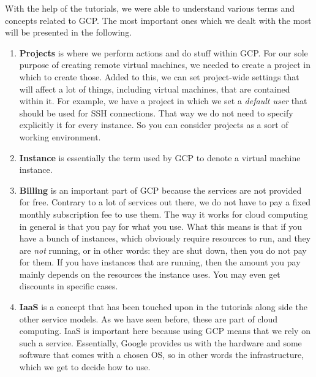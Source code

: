 With the help of the tutorials, we were able to understand various
terms and concepts related to GCP. The most important ones which we
dealt with the most will be presented in the following.

\begin{enumerate}

	\item \textbf{Projects} is where we perform actions and do stuff
	within GCP. For our sole purpose of creating remote virtual
	machines, we needed to create a project in which to create those.
	Added to this, we can set project-wide settings that will affect a
	lot of things, including virtual machines, that are contained
	within it. For example, we have a project in which we set a
	\textit{default user} that should be used for SSH connections.
	That way we do not need to specify explicitly it for every
	instance. So you can consider projects as a sort of working
	environment.

	\item \textbf{Instance} is essentially the term used by GCP to
	denote a virtual machine instance. 

	\item \textbf{Billing} is an important part of GCP because the
	services are not provided for free. Contrary to a lot of services
	out there, we do not have to pay a fixed monthly subscription fee
	to use them. The way it works for cloud computing in general is
	that you pay for what you use. What this means is that if you have
	a bunch of instances, which obviously require resources to run,
	and they are \emph{not} running, or in other words: they are shut
	down, then you do not pay for them. If you have instances that are
	running, then the amount you pay mainly depends on the resources
	the instance uses. You may even get discounts in specific cases. 

	\item \textbf{IaaS} is a concept that has been touched upon in the
	tutorials along side the other service models. As we have seen
	before, these are part of cloud computing. IaaS is important here
	because using GCP means that we rely on such a service.
	Essentially, Google provides us with the hardware and some
	software that comes with a chosen OS, so in other words the
	infrastructure, which we get to decide how to use.
	 
\end{enumerate}
